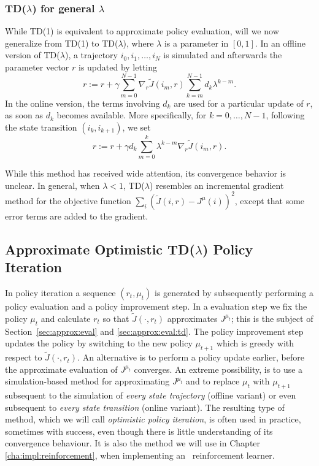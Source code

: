 \subsubsection*{TD($\lambda$) for general $\lambda$}
While TD(1) is equivalent to approximate policy evaluation, will we now generalize from TD(1) to TD($\lambda$), where $\lambda$ is a parameter in $[0,1]$. In an offline version of TD($\lambda$), a trajectory $i_0,i_1,\ldots,i_N$ is simulated and afterwards the parameter vector $r$ is updated by letting 
$$r:=r+\gamma \sum_{m=0}^{N-1} \nabla_r \tilde J(i_m,r) \sum_{k=m}^{N-1} d_k \lambda^{k-m}.$$
In the online version, the terms involving $d_k$ are used for a particular update of $r$, as soon as $d_k$ becomes available. More specifically, for $k=0,\ldots,N-1$, following the state transition $(i_k,i_{k+1})$, we set
$$r:= r + \gamma d_k \sum_{m=0}^k \lambda^{k-m} \nabla_r \tilde J(i_m,r).$$

While this method has received wide attention, its convergence behavior is unclear. In general, when $\lambda < 1$, TD($\lambda$) resembles an incremental gradient method for the objective function $\sum_i \left( \tilde J(i,r) - J^\mu(i) \right )^2$, except that some error terms are added to the gradient.








\subsection{Approximate Optimistic TD($\lambda$) Policy Iteration}
\label{sec:optimistic}
In policy iteration a sequence $(r_t,\mu_t)$ is generated by subsequently performing a policy evaluation and a policy improvement step. In a evaluation step we fix the policy $\mu_t$ and calculate $r_t$ so that $\tilde J(\cdot,r_t)$ approximates $J^{\mu_t}$; this is the subject of Section~\ref{sec:approx:eval} and \ref{sec:approx:eval:td}. The policy improvement step updates the policy by switching to the new policy $\mu_{t+1}$ which is greedy with respect to $\tilde J(\cdot,r_t)$. An alternative is to perform a policy update earlier, before the approximate evaluation of $J^{\mu_t}$ converges. An extreme possibility, is to use a simulation-based method for approximating $J^{\mu_t}$ and to replace $\mu_t$ with $\mu_{t+1}$ subsequent to the simulation of \emph{every state trajectory} (offline variant) or even subsequent to \emph{every state transition} (online variant). The resulting type of method, which we will call \emph{optimistic policy iteration}, is often used in practice, sometimes with success, even though there is little understanding of its convergence behaviour. It is also the method we will use in Chapter \ref{cha:impl:reinforcement}, when implementing an \Abalone\ reinforcement learner.





